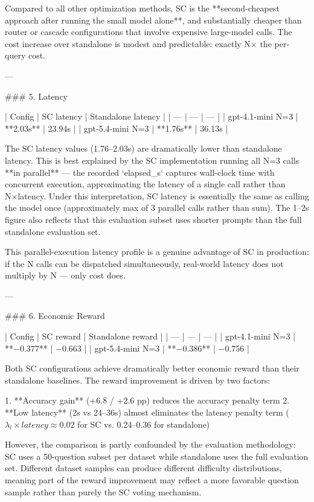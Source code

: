 Compared to all other optimization methods, SC is the **second-cheapest approach after running the small model alone**, and substantially cheaper than router or cascade configurations that involve expensive large-model calls. The cost increase over standalone is modest and predictable: exactly N× the per-query cost.

---

### 5. Latency

| Config | SC latency | Standalone latency |
| --- | --- | --- |
| gpt-4.1-mini N=3 | **2.03s** | 23.94s |
| gpt-5.4-mini N=3 | **1.76s** | 36.13s |

The SC latency values (1.76–2.03s) are dramatically lower than standalone latency. This is best explained by the SC implementation running all N=3 calls **in parallel** — the recorded `elapsed_s` captures wall-clock time with concurrent execution, approximating the latency of a single call rather than N×latency. Under this interpretation, SC latency is essentially the same as calling the model once (approximately max of 3 parallel calls rather than sum). The 1–2s figure also reflects that this evaluation subset uses shorter prompts than the full standalone evaluation set.

This parallel-execution latency profile is a genuine advantage of SC in production: if the N calls can be dispatched simultaneously, real-world latency does not multiply by N — only cost does.

---

### 6. Economic Reward

| Config | SC reward | Standalone reward |
| --- | --- | --- |
| gpt-4.1-mini N=3 | **−0.377** | −0.663 |
| gpt-5.4-mini N=3 | **−0.386** | −0.756 |

Both SC configurations achieve dramatically better economic reward than their standalone baselines. The reward improvement is driven by two factors:

1. **Accuracy gain** (+6.8 / +2.6 pp) reduces the accuracy penalty term
2. **Low latency** (2s vs 24–36s) almost eliminates the latency penalty term ($\lambda_l \times latency \approx 0.02$ for SC vs. 0.24–0.36 for standalone)

However, the comparison is partly confounded by the evaluation methodology: SC uses a 50-question subset per dataset while standalone uses the full evaluation set. Different dataset samples can produce different difficulty distributions, meaning part of the reward improvement may reflect a more favorable question sample rather than purely the SC voting mechanism.

